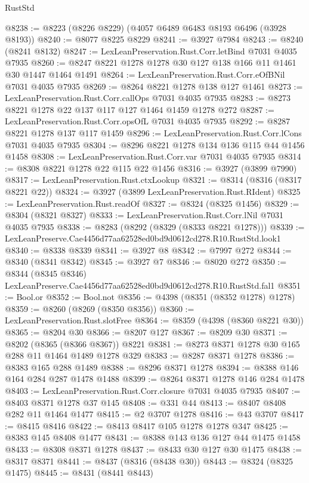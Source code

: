 \begin{lexlean}{RustStd}
\begin{coremodule}
@8238 := @8223 (@8226 @8229) (@4057 @6489 @6483 @8193 @6496 (@3928 @8193))
@8240 := @8077 @8225 @8229
@8241 := @3927 @7984
@8243 := @8240 (@8241 @8132)
@8247 := LexLeanPreservation.Rust.Corr.letBind @7031 @4035 @7935
@8260 := @8247 @8221 @1278 @1278 @30 @127 @138 @166 @11 @1461 @30 @1447 @1464 @1491
@8264 := LexLeanPreservation.Rust.Corr.eOfBNil @7031 @4035 @7935
@8269 := @8264 @8221 @1278 @138 @127 @1461
@8273 := LexLeanPreservation.Rust.Corr.callOps @7031 @4035 @7935
@8283 := @8273 @8221 @1278 @22 @137 @117 @127 @1464 @1459 @1278 @272
@8287 := LexLeanPreservation.Rust.Corr.opsOfL @7031 @4035 @7935
@8292 := @8287 @8221 @1278 @137 @117 @1459
@8296 := LexLeanPreservation.Rust.Corr.lCons @7031 @4035 @7935
@8304 := @8296 @8221 @1278 @134 @136 @115 @44 @1456 @1458
@8308 := LexLeanPreservation.Rust.Corr.var @7031 @4035 @7935
@8314 := @8308 @8221 @1278 @22 @115 @22 @1456
@8316 := @3927 (@3899 @7990)
@8317 := LexLeanPreservation.Rust.ctxLookup
@8321 := @8314 (@8316 (@8317 @8221 @22))
@8324 := @3927 (@3899 LexLeanPreservation.Rust.RIdent)
@8325 := LexLeanPreservation.Rust.readOf
@8327 := @8324 (@8325 @1456)
@8329 := @8304 (@8321 @8327)
@8333 := LexLeanPreservation.Rust.Corr.lNil @7031 @4035 @7935
@8338 := @8283 (@8292 (@8329 (@8333 @8221 @1278)))
@8339 := LexLeanPreserve.Cae4456d77aa62528ed0bd9d0612cd278.R10.RustStd.look1
@8340 := @8338 @8339
@8341 := @3927 @8
@8342 := @7997 @272
@8344 := @8340 (@8341 @8342)
@8345 := @3927 @7
@8346 := @8020 @272
@8350 := @8344 (@8345 @8346) LexLeanPreserve.Cae4456d77aa62528ed0bd9d0612cd278.R10.RustStd.fal1
@8351 := Bool.or
@8352 := Bool.not
@8356 := @4398 (@8351 (@8352 @1278) @1278)
@8359 := @8260 (@8269 (@8350 @8356))
@8360 := LexLeanPreservation.Rust.slotFree
@8364 := @8359 (@4398 (@8360 @8221 @30))
@8365 := @8204 @30
@8366 := @8207 @127
@8367 := @8209 @30
@8371 := @8202 (@8365 (@8366 @8367)) @8221
@8381 := @8273 @8371 @1278 @30 @165 @288 @11 @1464 @1489 @1278 @329
@8383 := @8287 @8371 @1278
@8386 := @8383 @165 @288 @1489
@8388 := @8296 @8371 @1278
@8394 := @8388 @146 @164 @284 @287 @1478 @1488
@8399 := @8264 @8371 @1278 @146 @284 @1478
@8403 := LexLeanPreservation.Rust.Corr.closure @7031 @4035 @7935
@8407 := @8403 @8371 @1278 @37 @145
@8408 := @331 @44
@8413 := @8407 @8408 @282 @11 @1464 @1477
@8415 := @2 @3707 @1278
@8416 := @43 @3707
@8417 := @8415 @8416
@8422 := @8413 @8417 @105 @1278 @1278 @347
@8425 := @8383 @145 @8408 @1477
@8431 := @8388 @143 @136 @127 @44 @1475 @1458
@8433 := @8308 @8371 @1278
@8437 := @8433 @30 @127 @30 @1475
@8438 := @8317 @8371
@8441 := @8437 (@8316 (@8438 @30))
@8443 := @8324 (@8325 @1475)
@8445 := @8431 (@8441 @8443)

\end{coremodule}
\end{lexlean}
